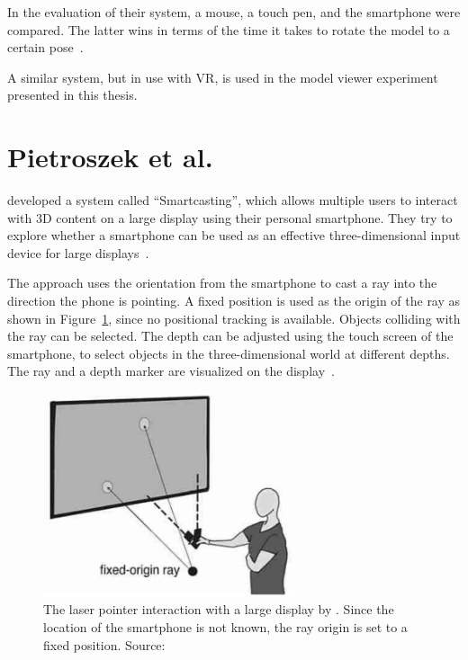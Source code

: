 In the evaluation of their system, a mouse, a touch pen, and the smartphone were compared. The latter wins in terms of the time it takes to rotate the model to a certain pose~\cite[140]{Katzakis.2010}.

A similar system, but in use with \gls{VR}, is used in the model viewer experiment presented in this thesis.

\section{Pietroszek et al.}\label{section:pietroszek-2014}
\citeauthor{Pietroszek.2014} developed a system called \enquote{Smartcasting}, which allows multiple users to interact with 3D content on a large display using their personal smartphone. They try to explore whether a smartphone can be used as an effective three-dimensional input device for large displays~\cite[119]{Pietroszek.2014}.

The approach uses the orientation from the smartphone to cast a ray into the direction the phone is pointing. A fixed position is used as the origin of the ray as shown in Figure~\ref{fig:pietroszek-2014}, since no positional tracking is available. Objects colliding with the ray can be selected. The depth can be adjusted using the touch screen of the smartphone, to select objects in the three-dimensional world at different depths. The ray and a depth marker are visualized on the display~\cite[121]{Pietroszek.2014}.

\begin{figure}[H]%
  \centering%
  \includegraphics[height=6cm]{figures/related_work/pietroszek_2014_laser_pointer.png}%
  \caption[Laser pointer implementation by Pietroszek et al.]{
  The laser pointer interaction with a large display by \citeauthor{Pietroszek.2014}. Since the location of the smartphone is not known, the ray origin is set to a fixed position.
  \newline{}
  Source:~\cite[Figure 3]{Pietroszek.2014}}\label{fig:pietroszek-2014}
\end{figure}

